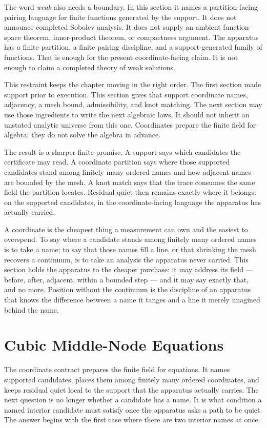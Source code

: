 The word \emph{weak} also needs a boundary. In this section it names a
partition-facing pairing language for finite functions generated by the
support. It does not announce completed Sobolev analysis. It does not supply an
ambient function-space theorem, inner-product theorem, or compactness
argument.
The apparatus has a finite partition, a finite pairing discipline, and a
support-generated family of functions. That is enough for the present
coordinate-facing claim. It is not enough to claim a completed theory of weak
solutions.

This restraint keeps the chapter moving in the right order. The first section
made support prior to execution. This section gives that support coordinate
names, adjacency, a mesh bound, admissibility, and knot matching. The next
section may use those ingredients to write the next algebraic laws.
It should not inherit an unstated analytic universe from this one. Coordinates
prepare the finite field for algebra; they do not solve the algebra in
advance.

The result is a sharper finite promise. A support says which candidates the
certificate may read. A coordinate partition says where those supported
candidates stand among finitely many ordered names and how adjacent names are
bounded by the mesh. A knot match says that the trace consumes the same field
the partition locates. Residual quiet then remains exactly where it belongs: on the supported candidates, in the coordinate-facing language the apparatus has actually carried.

A coordinate is the cheapest thing a measurement can own and the easiest to overspend. To say where a candidate stands among finitely many ordered names is to take a name; to say that those names fill a line, or that shrinking the mesh recovers a continuum, is to take an analysis the apparatus never carried. This section holds the apparatus to the cheaper purchase: it may address its field --- before, after, adjacent, within a bounded step --- and it may say exactly that, and no more. Position without the continuum is the discipline of an apparatus that knows the difference between a name it tanges and a line it merely imagined behind the name.

\section{Cubic Middle-Node Equations}

The coordinate contract prepares the finite field for equations. It names
supported candidates, places them among finitely many ordered coordinates, and
keeps residual quiet local to the support that the apparatus actually carries.
The next question is no longer whether a candidate has a name. It is what
condition a named interior candidate must satisfy once the apparatus asks a
path to be quiet. The answer begins with the first case where there are two
interior names at once.

